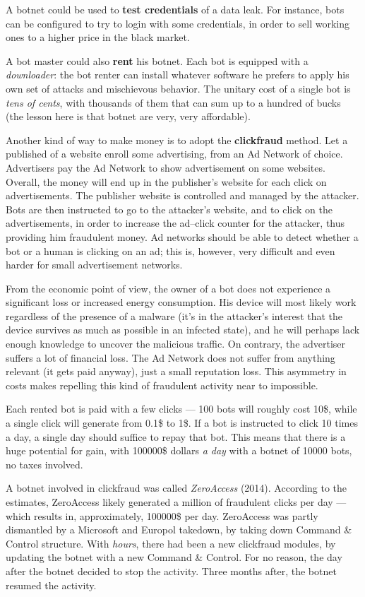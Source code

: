 \documentclass[10pt]{\classname}
\begin{document}
A botnet could be used to \textbf{test credentials} of a data leak. For instance,
bots can be configured to try to login with some credentials, in order to sell
working ones to a higher price in the black market.

A bot master could also \textbf{rent} his botnet. Each bot is equipped with a
\emph{downloader}: the bot renter can install whatever software he prefers to
apply his own set of attacks and mischievous behavior. The unitary cost of a
single bot is \emph{tens of cents}, with thousands of them that can sum up to a
hundred of bucks (the lesson here is that botnet are very, very affordable).

Another kind of way to make money is to adopt the \textbf{clickfraud} method.
Let a published of a website enroll some advertising, from an Ad Network of
choice. Advertisers pay the Ad Network to show advertisement on some websites.
Overall, the money will end up in the publisher's website for each click on
advertisements. The publisher website is controlled and managed by the
attacker. Bots are then instructed to go to the attacker's website, and to
click on the advertisements, in order to increase the ad--click counter for the
attacker, thus providing him fraudulent money. Ad networks should be able to
detect whether a bot or a human is clicking on an ad; this is, however, very
difficult and even harder for small advertisement networks.

From the economic point of view, the owner of a bot does not experience a
significant loss or increased energy consumption. His device will most likely
work regardless of the presence of a malware (it's in the attacker's interest
that the device survives as much as possible in an infected state), and he will
perhaps lack enough knowledge to uncover the malicious traffic. On contrary, the
advertiser suffers a lot of financial loss. The Ad Network does not suffer from
anything relevant (it gets paid anyway), just a small reputation loss. This
asymmetry in costs makes repelling this kind of fraudulent activity near to
impossible.

Each rented bot is paid with a few clicks --- 100 bots will roughly cost 10\$,
while a single click will generate from 0.1\$ to 1\$. If a bot is instructed to
click 10 times a day, a single day should suffice to repay that bot. This means
that there is a huge potential for gain, with 100000\$ dollars \emph{a day}
with a botnet of 10000 bots, no taxes involved.

A botnet involved in clickfraud was called \emph{ZeroAccess} (2014). According
to the estimates, ZeroAccess likely generated a million of fraudulent clicks
per day --- which results in, approximately, 100000\$ per day. ZeroAccess was
partly dismantled by a Microsoft and Europol takedown, by taking down Command
\& Control structure. With \emph{hours}, there had been a new clickfraud
modules, by updating the botnet with a new Command \& Control. For no reason,
the day after the botnet decided to stop the activity. Three months after, the
botnet resumed the activity.
\end{document}

